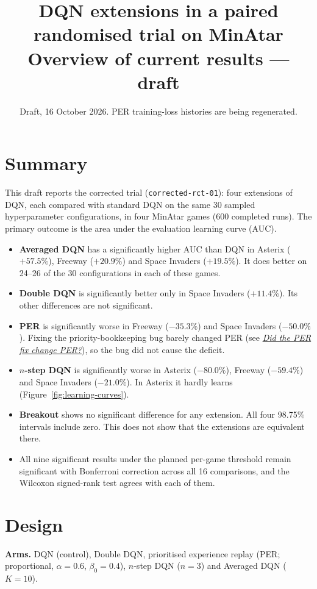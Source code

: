 \documentclass[11pt,a4paper]{article}
\title{DQN extensions in a paired randomised trial on MinAtar\\[2pt]
\large Overview of current results --- draft}
\author{}
\date{Draft, 16 October 2026. PER training-loss histories are being regenerated.}
\begin{document}
\maketitle
\vspace{-2em}

\section*{Summary}
This draft reports the corrected trial (\texttt{corrected-rct-01}): four
extensions of DQN, each compared with standard DQN on the same 30 sampled
hyperparameter configurations, in four MinAtar games (600 completed runs).
The primary outcome is the area under the evaluation learning curve (AUC).

\begin{itemize}
    \item \textbf{Averaged DQN} has a significantly higher AUC than DQN in
    Asterix ($+57.5\%$), Freeway ($+20.9\%$) and Space Invaders ($+19.5\%$).
    It does better on 24--26 of the 30 configurations in each of these games.
    \item \textbf{Double DQN} is significantly better only in Space Invaders
    ($+11.4\%$). Its other differences are not significant.
    \item \textbf{PER} is significantly worse in Freeway ($-35.3\%$) and
    Space Invaders ($-50.0\%$). Fixing the priority-bookkeeping bug barely
    changed PER (see \hyperref[sec:per-fix]{\emph{Did the PER fix change PER?}}), so the bug did not cause the deficit.
    \item \textbf{$n$-step DQN} is significantly worse in Asterix ($-80.0\%$),
    Freeway ($-59.4\%$) and Space Invaders ($-21.0\%$). In Asterix it hardly
    learns (Figure~\ref{fig:learning-curves}).
    \item \textbf{Breakout} shows no significant difference for any extension.
    All four 98.75\% intervals include zero. This does not show that the
    extensions are equivalent there.
    \item All nine significant results under the planned per-game threshold
    remain significant with Bonferroni correction across all 16 comparisons,
    and the Wilcoxon signed-rank test agrees with each of them.
\end{itemize}

\section*{Design}
\textbf{Arms.} DQN (control), Double DQN, prioritised experience replay
(PER; proportional, $\alpha=0.6$, $\beta_0=0.4$), $n$-step DQN ($n=3$) and
Averaged DQN ($K=10$).
\end{document}
